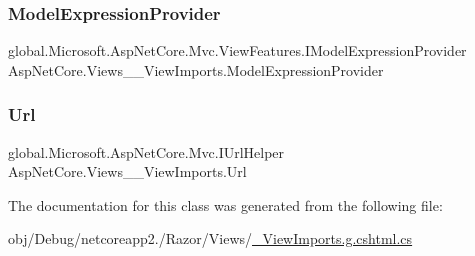\mbox{\label{class_asp_net_core_1_1_views_____view_imports_af24a853448780518b9b8bb0494fc03d0}} 
\subsubsection{\texorpdfstring{ModelExpressionProvider}{ModelExpressionProvider}}
{\footnotesize\ttfamily global.\+Microsoft.\+Asp\+Net\+Core.\+Mvc.\+View\+Features.\+I\+Model\+Expression\+Provider Asp\+Net\+Core.\+Views\+\_\+\+\_\+\+View\+Imports.\+Model\+Expression\+Provider\hspace{0.3cm}{\ttfamily [get]}}

\mbox{\label{class_asp_net_core_1_1_views_____view_imports_af6e6f9f7d99285bd76a2db97f17a9128}} 
\subsubsection{\texorpdfstring{Url}{Url}}
{\footnotesize\ttfamily global.\+Microsoft.\+Asp\+Net\+Core.\+Mvc.\+I\+Url\+Helper Asp\+Net\+Core.\+Views\+\_\+\+\_\+\+View\+Imports.\+Url\hspace{0.3cm}{\ttfamily [get]}}



The documentation for this class was generated from the following file\+:\begin{DoxyCompactItemize}
\item 
obj/\+Debug/netcoreapp2./\+Razor/\+Views/\mbox{\hyperlink{___view_imports_8g_8cshtml_8cs}{\+\_\+\+View\+Imports.\+g.\+cshtml.\+cs}}\end{DoxyCompactItemize}
